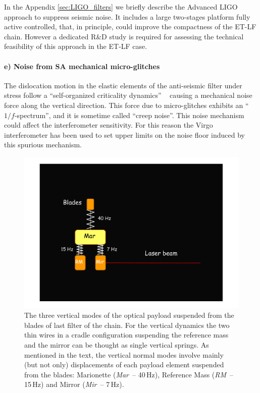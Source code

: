 In the Appendix \ref{sec:LIGO_filters} we briefly describe the Advanced LIGO  approach to suppress seismic noise. It includes a large two-stages platform  fully active controlled, that, in principle, could improve the compactness of the  ET-LF chain. However a dedicated R\&D study is required for assessing the technical feasibility of this approach in the  ET-LF case.

\paragraph{e) Noise from SA mechanical micro-glitches}

The dislocation motion in the elastic elements of the anti-seismic filter under stress follow a ``self-organized criticality dynamics'' ~\cite{Marchesoni1994}  causing a mechanical noise force along the vertical direction. This force due to micro-glitches exhibits an ``$1/f$-spectrum'', and it is sometime called ``creep noise''. This noise mechanism could affect the interferometer sensitivity. For this reason the Virgo interferometer has been used to set upper limits on the noise floor induced by this spurious mechanism.
\begin{figure}[t]
	\begin{center}
		\includegraphics[width=13cm]{./Sec_Suspensions/Figures/Creep-Fig1.pdf}
			\caption{The three vertical modes of the optical payload suspended from the blades of last filter of the chain. For the vertical dynamics the two thin wires in a cradle configuration suspending the reference mass and the mirror can be thought as single vertical springs. As mentioned in the text, the vertical normal modes involve mainly (but not only) displacements of each payload element suspended from the blades: Marionette (\emph{Mar}~-- 40\,Hz), Reference Mass (\emph{RM}~-- 15\,Hz) and Mirror (\emph{Mir}~-- 7\,Hz).}
\label{CFig1}
	\end{center}
\end{figure}
